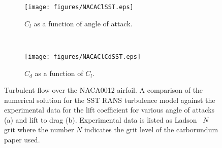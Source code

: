 \begin{figure}[h!]
    \centering
    \captionsetup{justification=centering}
    \begin{subfigure}[b]{0.48\textwidth}
    \centering
    \captionsetup{justification=centering}
       \texttt{[image: figures/NACAClSST.eps]}
        \caption{$C_l$ as a function of angle of attack.}
       \label{fig:nacaclcdsstcl}
    \end{subfigure}
    ~ %
          \begin{subfigure}[b]{0.48\textwidth}
    \centering
    \captionsetup{justification=centering}
      \texttt{[image: figures/NACAClCdSST.eps]}
        \caption{$C_d$ as a function of $C_l$.}
       \label{fig:nacaclcdsstcd}
    \end{subfigure}        
  \caption{Turbulent flow over the NACA0012 airfoil. A comparison of the numerical solution for the SST RANS turbulence model against the experimental data for the lift coefficient for various angle of attacks (a) and lift to drag (b). Experimental data is listed as Ladson~\cite{ladson1988effects} $N$ grit where the number $N$ indicates the grit level of the carborundum paper used.}
  \label{fig:nacasst}
\end{figure}

